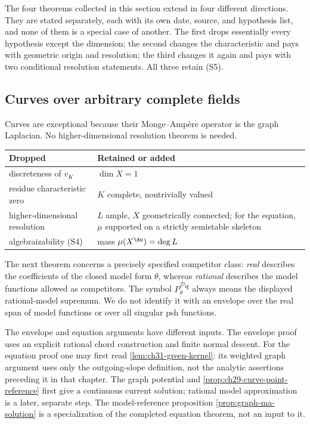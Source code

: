 The four theorems collected in this section extend
 in four different directions.
They are stated separately, each with its own date, source, and hypothesis
list, and none of them is a special case of another.  The first drops
essentially every hypothesis except the dimension; the second changes the
characteristic and pays with geometric origin and resolution; the third
changes it again and pays with two conditional resolution statements.  All
three retain \textup{(S5)}.

\subsection{Curves over arbitrary complete fields}
\label{sec:ch29-later-curves}

Curves are exceptional because their Monge--Amp\`ere operator is the graph
Laplacian.  No higher-dimensional resolution theorem is needed.

\begin{center}
\small
\begin{tabular}{p{}|p{}}
\toprule
\textbf{Dropped}&\textbf{Retained or added}\\
\midrule
discreteness of \(v_K\)
 &\(\dim X=1\)\\
residue characteristic zero
 &\(K\) complete, nontrivially valued\\
higher-dimensional resolution
 &\(L\) ample, \(X\) geometrically connected; for the equation,
  \(\mu\) supported on a strictly semistable skeleton\\
algebraizability \textup{(S4)}
 &mass \(\mu(X^{\An})=\deg L\)\\
\bottomrule
\end{tabular}
\end{center}


The next theorem concerns a precisely specified competitor class:
\emph{real} describes the coefficients of the closed model form
\(\theta\), whereas \emph{rational} describes the model functions
allowed as competitors.  The symbol
\(P_\theta^{\mathcal D_{\mathbf Q}}\) always means the displayed
rational-model supremum.  We do not identify it with an envelope
over the real span of model functions or over all singular psh functions.

The envelope and equation arguments have different inputs.
The envelope proof uses an explicit rational chord construction and
finite normal descent.  For the equation proof one may first read
\cref{lem:ch31-green-kernel}: its weighted graph argument uses only
the outgoing-slope definition, not the analytic assertions preceding
it in that chapter.  The graph potential and
\cref{prop:ch29-curve-point-reference} first give a continuous current
solution; rational model approximation is a later, separate step.
The model-reference proposition \cref{prop:graph-ma-solution} is
a specialization of the completed equation theorem, not an input to it.

